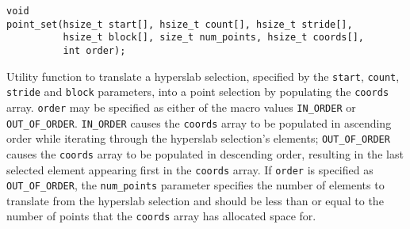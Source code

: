\documentclass[../HDF5_RFC.tex]{subfiles}
\begin{document}
\begin{verbatim}
void
point_set(hsize_t start[], hsize_t count[], hsize_t stride[],
          hsize_t block[], size_t num_points, hsize_t coords[],
          int order);
\end{verbatim}

Utility function to translate a hyperslab selection, specified by the \texttt{start}, \texttt{count}, \texttt{stride} and \texttt{block} parameters, into a point selection by populating the \texttt{coords}
array. \texttt{order} may be specified as either of the macro values \texttt{IN\_ORDER} or
\texttt{OUT\_OF\_ORDER}. \texttt{IN\_ORDER} causes the \texttt{coords} array to be populated in ascending
order while iterating through the hyperslab selection's elements; \texttt{OUT\_OF\_ORDER} causes the
\texttt{coords} array to be populated in descending order, resulting in the last selected element appearing
first in the \texttt{coords} array. If \texttt{order} is specified as \texttt{OUT\_OF\_ORDER}, the
\texttt{num\_points} parameter specifies the number of elements to translate from the hyperslab selection
and should be less than or equal to the number of points that the \texttt{coords} array has allocated space for.
\end{document}
